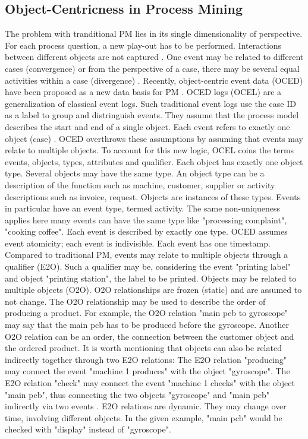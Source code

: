 
\subsection{Object-Centricness in Process Mining}
\label{sec:object-centric-event-logs}

The problem with tranditional PM lies in its single dimensionality of perspective. For each process question, a new play-out has to be performed. Interactions between different objects are not captured \autocite{van2023object}. One event may be related to different cases (convergence) or from the perspective of a case, there may be several equal activities within a case (divergence) \autocite{van2019object}.
Recently, object-centric event data (OCED) have been proposed as a new data basis for PM \autocite{van2019object}. OCED logs (OCEL) are a generalization of classical event logs. Such traditional event logs use the case ID as a label to group and distringuish events. They assume that the process model describes the start and end of a single object. Each event refers to exactly one object (case) \autocite{van2023object}. OCED overthrows these assumptions by assuming that events may relate to multiple objects. To account for this new logic, OCEL coins the terms events, objects, types, attributes and qualifier. Each object has exactly one object type. Several objects may have the same type. An object type can be a description of the function such as machine, customer, supplier or activity descriptions such as invoice, request. Objects are instances of these types. Events in particular have an event type, termed activity. The same non-uniqueness applies here \textemdash many events can have the same type like "processing complaint", "cooking coffee". Each event is described by exactly one type. OCED assumes event atomicity; each event is indivisible. Each event has one timestamp. Compared to traditional PM, events may relate to multiple objects through a qualifier (E2O). Such a qualifier may be, considering the event "printing label" and object "printing station", the label to be printed. Objects may be related to multiple objects (O2O). O2O relationships are frozen (static) and are assumed to not change. The O2O relationship may be used to describe the order of producing a product. For example, the O2O relation "main pcb to gyroscope" may say that the main pcb has to be produced before the gyroscope. Another O2O relation can be an order, the connection between the customer object and the ordered product. It is worth mentioning that objects can also be related indirectly together through two E2O relations: The E2O relation "producing" may connect the event "machine 1 produces" with the object "gyroscope". The E2O relation "check" may connect the event "machine 1 checks" with the object "main pcb", thus connecting the two objects "gyroscope" and "main pcb" indirectly via two events \autocite{van2019object}. E2O relations are dynamic. They may change over time, involving different objects. In the given example, "main pcb" would be checked with "display" instead of "gyroscope".


